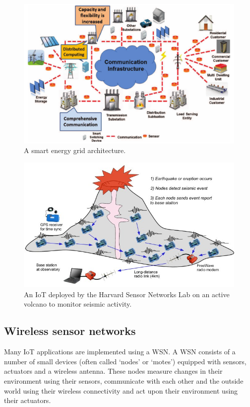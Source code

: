 \begin{figure}
    \centering
    \includegraphics[width=\textwidth]{images/smart-grid-architecture.pdf}
    \caption[Example of a smart energy grid architecture]{A smart energy grid architecture. \cite{gungor-smart-grid-technologies}}
    \label{fig:intro:iot:smart-grid}
\end{figure}

\begin{figure}
    \centering
    \includegraphics[width=\textwidth]{images/reventador.jpg}
    \caption[Example of IoT deployed on active volcano]{An \gls{IoT} deployed by the Harvard Sensor Networks Lab on an active volcano to monitor seismic activity. \cite{reventador}}
    \label{fig:intro:iot:reventador}
\end{figure}

\subsection{Wireless sensor networks}
\label{sec:intro:wsn}
Many \gls{IoT} applications are implemented using a \acrfull{WSN}. A \gls{WSN} consists of a number of small devices (often called `nodes' or `motes') equipped with sensors, actuators and a wireless antenna. These nodes measure changes in their environment using their sensors, communicate with each other and the outside world using their wireless connectivity and act upon their environment using their actuators.

